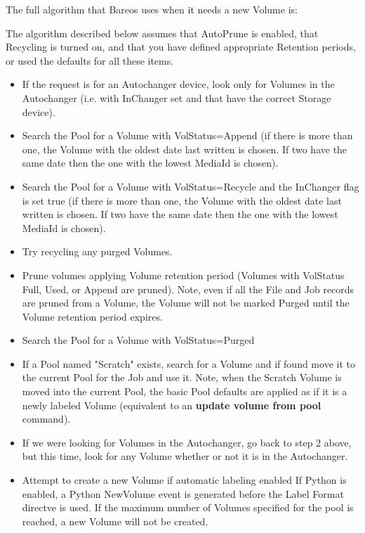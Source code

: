 The full algorithm that Bareos uses when it needs a new Volume is:

The algorithm described below assumes that AutoPrune is enabled,
that Recycling is turned on, and that you have defined
appropriate Retention periods, or used the defaults for all these
items.

\begin{itemize}
\item If the request is for an Autochanger device, look only
   for Volumes in the Autochanger (i.e. with InChanger set and that have
   the correct Storage device).
\item Search the Pool for a Volume with VolStatus=Append (if there is more
   than one, the Volume with the oldest date last written is chosen.  If
   two have the same date then the one with the lowest MediaId is chosen).
\item Search the Pool for a Volume with VolStatus=Recycle and the InChanger
   flag is set true (if there is more than one, the Volume with the oldest
   date last written is chosen.  If two have the same date then the one
   with the lowest MediaId is chosen).
\item Try recycling any purged Volumes.
\item Prune volumes applying Volume retention period (Volumes with VolStatus
   Full, Used, or Append are pruned). Note, even if all the File and Job
   records are pruned from a Volume, the Volume will not be marked Purged
   until the Volume retention period expires.
\item Search the Pool for a Volume with VolStatus=Purged
\item If a Pool named "Scratch" exists, search for a Volume and if found
   move it to the current Pool for the Job and use it. Note, when
   the Scratch Volume is moved into the current Pool, the basic
   Pool defaults are applied as if it is a newly labeled Volume
   (equivalent to an {\bf update volume from pool} command).
\item If we were looking for Volumes in the Autochanger, go back to
   step 2 above, but this time, look for any Volume whether or not
   it is in the Autochanger.
\item Attempt to create a new Volume if automatic labeling enabled
   If Python is enabled, a Python NewVolume event is generated before
   the Label Format directve is used. If the maximum number of Volumes
   specified for the pool is reached, a new Volume will not be created.

\end{itemize}
